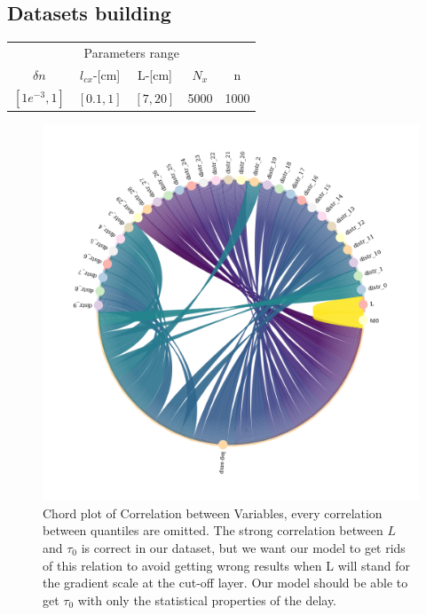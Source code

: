 \documentclass[11pt,a4paper]{report}
\begin{document}
\begin{multicols}{2}
    \subsection{Datasets building}
    \begin{center}
        \begin{tabular}{ccccc}
            \toprule
            \multicolumn{5}{c}{Parameters range}                     \\
            \cmidrule{1 -5}
            $\delta n$     & $l_{cx}$-[cm] & L-[cm]   & $N_x$ & n    \\
            \midrule
            $[1e^{-3}, 1]$ & $[0.1,1]$     & $[7,20]$ & 5000  & 1000 \\
            \bottomrule
        \end{tabular}
    \end{center}

    \begin{figure}[H]
        \centering
        \includegraphics[width=1\linewidth]{./figures/chord.png}
        \caption{Chord plot of Correlation between Variables, every correlation between quantiles are omitted. The strong correlation between $L$ and $\tau_0$ is correct in our dataset, but we want our model to get rids of this relation to avoid getting wrong results when L will stand for the gradient scale at the cut-off layer.
            Our model should be able to get $\tau_0$ with only the statistical properties of the delay.}
        \label{}
    \end{figure}



\end{multicols}
\end{document}
